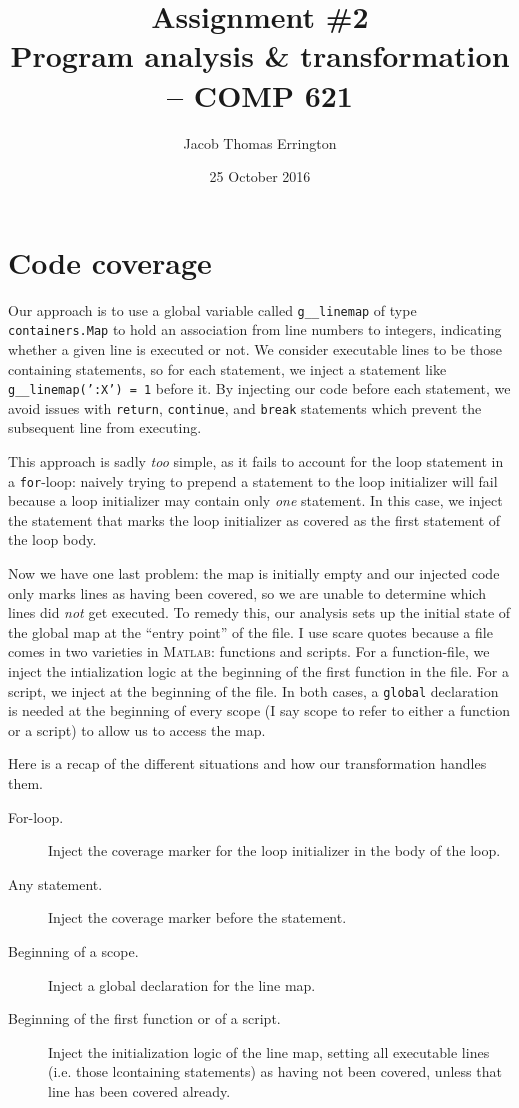 \documentclass[letterpaper,11pt]{article}
\author{Jacob Thomas Errington}
\title{Assignment \#2\\Program analysis \& transformation -- COMP 621}
\date{25 October 2016}
\newcommand{\matlab}{\textsc{Matlab}}
\begin{document}
\section{Code coverage}

Our approach is to use a global variable called \texttt{g__linemap} of type
\texttt{containers.Map} to hold an association from line numbers to integers,
indicating whether a given line is executed or not. We consider executable
lines to be those containing statements, so for each statement, we inject a
statement like \texttt{g__linemap(':X') = 1} before it. By injecting our code
before each statement, we avoid issues with \texttt{return}, \texttt{continue},
and \texttt{break} statements which prevent the subsequent line from executing.

This approach is sadly \emph{too} simple, as it fails to account for the loop
statement in a \texttt{for}-loop: naively trying to prepend a statement to the
loop initializer will fail because a loop initializer may contain only
\emph{one} statement. In this case, we inject the statement that marks the loop
initializer as covered as the first statement of the loop body.

Now we have one last problem: the map is initially empty and our injected code
only marks lines as having been covered, so we are unable to determine which
lines did \emph{not} get executed. To remedy this, our analysis sets up the
initial state of the global map at the ``entry point'' of the file. I use scare
quotes because a file comes in two varieties in \matlab{}: functions and
scripts. For a function-file, we inject the intialization logic at the
beginning of the first function in the file. For a script, we inject at the
beginning of the file. In both cases, a \texttt{global} declaration is needed
at the beginning of every scope (I say scope to refer to either a function or a
script) to allow us to access the map.

Here is a recap of the different situations and how our transformation handles
them.
\begin{description}
    \item[For-loop.]
        Inject the coverage marker for the loop initializer in the body of the
        loop.

    \item[Any statement.]
        Inject the coverage marker before the statement.

    \item[Beginning of a scope.]
        Inject a global declaration for the line map.

    \item[Beginning of the first function or of a script.]
        Inject the initialization logic of the line map, setting all executable
        lines (i.e. those lcontaining statements) as having not been covered,
        unless that line has been covered already.
\end{description}
\end{document}
